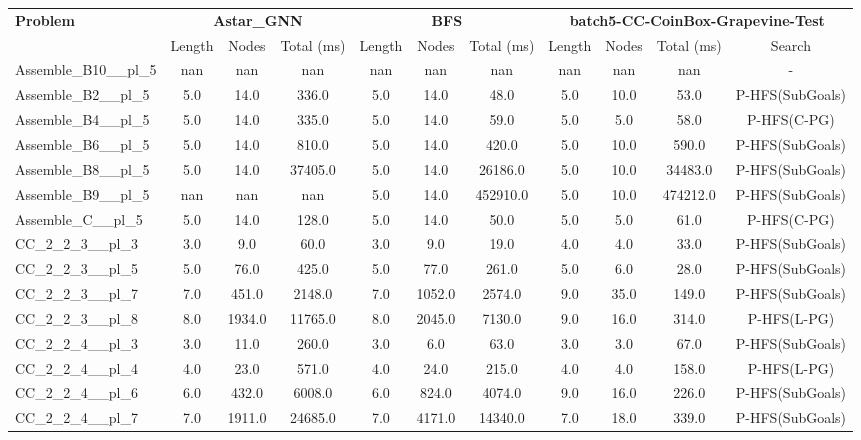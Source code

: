 \begin{table}[!ht]
\centering
\scriptsize
\begin{tabular}{l|ccc|ccc|cccc}
\multirow{2}{*}{\textbf{Problem}} & \multicolumn{3}{c|}{\textbf{Astar\_GNN}} & \multicolumn{3}{c|}{\textbf{BFS}} & \multicolumn{4}{c}{\textbf{batch5-CC-CoinBox-Grapevine-Test}} \\
\cline{2-11}
& Length & Nodes & Total (ms) & Length & Nodes & Total (ms) & Length & Nodes & Total (ms) & Search \\
\hline
Assemble\_B10\_\_pl\_5 & nan & nan & nan & nan & nan & nan & nan & nan & nan & - \\
Assemble\_B2\_\_pl\_5 & 5.0 & 14.0 & 336.0 & 5.0 & 14.0 & 48.0 & 5.0 & 10.0 & 53.0 & P-HFS(SubGoals) \\
Assemble\_B4\_\_pl\_5 & 5.0 & 14.0 & 335.0 & 5.0 & 14.0 & 59.0 & 5.0 & 5.0 & 58.0 & P-HFS(C-PG) \\
Assemble\_B6\_\_pl\_5 & 5.0 & 14.0 & 810.0 & 5.0 & 14.0 & 420.0 & 5.0 & 10.0 & 590.0 & P-HFS(SubGoals) \\
Assemble\_B8\_\_pl\_5 & 5.0 & 14.0 & 37405.0 & 5.0 & 14.0 & 26186.0 & 5.0 & 10.0 & 34483.0 & P-HFS(SubGoals) \\
Assemble\_B9\_\_pl\_5 & nan & nan & nan & 5.0 & 14.0 & 452910.0 & 5.0 & 10.0 & 474212.0 & P-HFS(SubGoals) \\
Assemble\_C\_\_pl\_5 & 5.0 & 14.0 & 128.0 & 5.0 & 14.0 & 50.0 & 5.0 & 5.0 & 61.0 & P-HFS(C-PG) \\
CC\_2\_2\_3\_\_pl\_3 & 3.0 & 9.0 & 60.0 & 3.0 & 9.0 & 19.0 & 4.0 & 4.0 & 33.0 & P-HFS(SubGoals) \\
CC\_2\_2\_3\_\_pl\_5 & 5.0 & 76.0 & 425.0 & 5.0 & 77.0 & 261.0 & 5.0 & 6.0 & 28.0 & P-HFS(SubGoals) \\
CC\_2\_2\_3\_\_pl\_7 & 7.0 & 451.0 & 2148.0 & 7.0 & 1052.0 & 2574.0 & 9.0 & 35.0 & 149.0 & P-HFS(SubGoals) \\
CC\_2\_2\_3\_\_pl\_8 & 8.0 & 1934.0 & 11765.0 & 8.0 & 2045.0 & 7130.0 & 9.0 & 16.0 & 314.0 & P-HFS(L-PG) \\
CC\_2\_2\_4\_\_pl\_3 & 3.0 & 11.0 & 260.0 & 3.0 & 6.0 & 63.0 & 3.0 & 3.0 & 67.0 & P-HFS(SubGoals) \\
CC\_2\_2\_4\_\_pl\_4 & 4.0 & 23.0 & 571.0 & 4.0 & 24.0 & 215.0 & 4.0 & 4.0 & 158.0 & P-HFS(L-PG) \\
CC\_2\_2\_4\_\_pl\_6 & 6.0 & 432.0 & 6008.0 & 6.0 & 824.0 & 4074.0 & 9.0 & 16.0 & 226.0 & P-HFS(SubGoals) \\
CC\_2\_2\_4\_\_pl\_7 & 7.0 & 1911.0 & 24685.0 & 7.0 & 4171.0 & 14340.0 & 7.0 & 18.0 & 339.0 & P-HFS(SubGoals) \\

\end{tabular}
\end{table}
